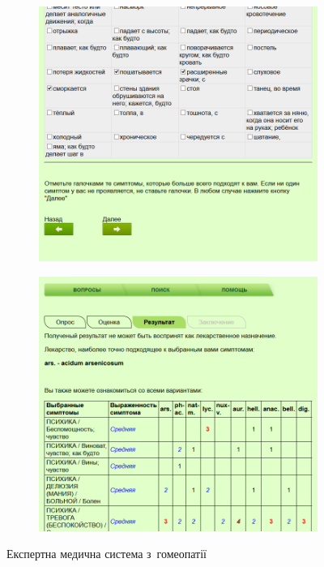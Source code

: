 \documentclass[
  a4paper,
  oneside,
  BCOR = 10mm,
  DIV = 12,
  12pt,
  headings = normal,
]{scrartcl}
\newlength{\gridunitwidth}
\begin{document}
\begin{figure}[!htbp]
\begin{subfigure}[b]{6 \gridunitwidth - 1em /2}
          \caption{}
          \label{subfig:homeopathy-02}
        \end{subfigure}
        \begin{subfigure}[b]{6 \gridunitwidth - 1em /2}
          \includegraphics[width = \columnwidth]{./assets/04.png}
          \caption{}
          \label{subfig:homeopathy-03}
        \end{subfigure}%
        \hspace{1em}%
        \begin{subfigure}[b]{6 \gridunitwidth - 1em /2}
          \includegraphics[width = \columnwidth]{./assets/05.png}
          \caption{}
          \label{subfig:homeopathy-04}
        \end{subfigure}%
        \caption{Експертна медична система з~гомеопатії}
        \label{fig:homeopathy}
      \end{figure}
\end{document}

